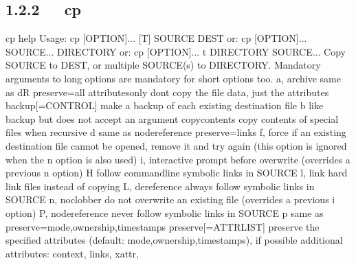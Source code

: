 \documentclass[letterpaper,12pt,english]{sphinxmanual}
\begin{document}
\subsection{1.2.2   cp}
\label{\detokenize{001software/001install/linux:cp}}
\begin{sphinxVerbatim}[commandchars=\\\{\}]
\PYGZdl{} cp \PYGZhy{}\PYGZhy{}help
Usage: cp [OPTION]... [\PYGZhy{}T] SOURCE DEST
  or:  cp [OPTION]... SOURCE... DIRECTORY
  or:  cp [OPTION]... \PYGZhy{}t DIRECTORY SOURCE...
Copy SOURCE to DEST, or multiple SOURCE(s) to DIRECTORY.
Mandatory arguments to long options are mandatory for short options too.
  \PYGZhy{}a, \PYGZhy{}\PYGZhy{}archive                same as \PYGZhy{}dR \PYGZhy{}\PYGZhy{}preserve=all
      \PYGZhy{}\PYGZhy{}attributes\PYGZhy{}only        don\PYGZsq{}t copy the file data, just the attributes
      \PYGZhy{}\PYGZhy{}backup[=CONTROL]       make a backup of each existing destination file
  \PYGZhy{}b                           like \PYGZhy{}\PYGZhy{}backup but does not accept an argument
      \PYGZhy{}\PYGZhy{}copy\PYGZhy{}contents          copy contents of special files when recursive
  \PYGZhy{}d                           same as \PYGZhy{}\PYGZhy{}no\PYGZhy{}dereference \PYGZhy{}\PYGZhy{}preserve=links
  \PYGZhy{}f, \PYGZhy{}\PYGZhy{}force                  if an existing destination file cannot be
                                 opened, remove it and try again (this option
                                 is ignored when the \PYGZhy{}n option is also used)
  \PYGZhy{}i, \PYGZhy{}\PYGZhy{}interactive            prompt before overwrite (overrides a previous \PYGZhy{}n
                                  option)
  \PYGZhy{}H                           follow command\PYGZhy{}line symbolic links in SOURCE
  \PYGZhy{}l, \PYGZhy{}\PYGZhy{}link                   hard link files instead of copying
  \PYGZhy{}L, \PYGZhy{}\PYGZhy{}dereference            always follow symbolic links in SOURCE
  \PYGZhy{}n, \PYGZhy{}\PYGZhy{}no\PYGZhy{}clobber             do not overwrite an existing file (overrides
                                 a previous \PYGZhy{}i option)
  \PYGZhy{}P, \PYGZhy{}\PYGZhy{}no\PYGZhy{}dereference         never follow symbolic links in SOURCE
  \PYGZhy{}p                           same as \PYGZhy{}\PYGZhy{}preserve=mode,ownership,timestamps
      \PYGZhy{}\PYGZhy{}preserve[=ATTR\PYGZus{}LIST]   preserve the specified attributes (default:
                                 mode,ownership,timestamps), if possible
                                 additional attributes: context, links, xattr,

\end{sphinxVerbatim}
\end{document}
